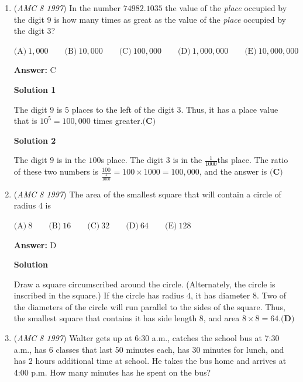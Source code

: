 \begin{enumerate}
 You may notice that adding $7$ either increases the digital sum by $7$, or decreases it by $2$, depending on whether there is carrying or not.

 


	\item (\textit{AMC 8 1997}) In the number $74982.1035$ the value of the \textit{place} occupied by the digit 9 is how many times as great as the value of the \textit{place} occupied by the digit 3?


 $\text{(A)}\ 1,000 \qquad \text{(B)}\ 10,000 \qquad \text{(C)}\ 100,000 \qquad \text{(D)}\ 1,000,000 \qquad \text{(E)}\ 10,000,000$

 \textbf{Answer: }C



\textbf{Solution 1}

The digit $9$ is $5$ places to the left of the digit $3$. Thus, it has a place value that is $10^5 = 100,000$ times greater.$\boxed{\textbf{(C)}}$




\textbf{Solution 2}

The digit $9$ is in the $100$s place.  The digit $3$ is in the $\frac{1}{1000}$ths place.  The ratio of these two numbers is $\frac{100}{\frac{1}{1000}} = 100\times1000 = 100,000$, and the answer is $\boxed{\textbf{(C)}}$



	\item (\textit{AMC 8 1997}) The area of the smallest square that will contain a circle of radius 4 is


 $\text{(A)}\ 8 \qquad \text{(B)}\ 16 \qquad \text{(C)}\ 32 \qquad \text{(D)}\ 64 \qquad \text{(E)}\ 128$

 \textbf{Answer: }D



\textbf{Solution}

Draw a square circumscribed around the circle.  (Alternately, the circle is inscribed in the square.)  If the circle has radius $4$, it has diameter $8$.  Two of the diameters of the circle will run parallel to the sides of the square.  Thus, the smallest square that contains it has side length $8$, and area $8\times8=64$.$\boxed{\textbf{(D)}}$



	\item (\textit{AMC 8 1997}) Walter gets up at 6:30 a.m., catches the school bus at 7:30 a.m., has 6 classes that last 50 minutes each, has 30 minutes for lunch, and has 2 hours additional time at school.  He takes the bus home and arrives at 4:00 p.m.  How many minutes has he spent on the bus?



\end{enumerate}
